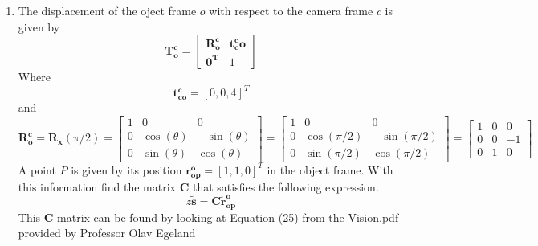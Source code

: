 \documentclass[12pt, letterpaper]{article}
\begin{document}
\begin{enumerate}
    \item The displacement of the oject frame $o$ with respect to the camera frame 
            $c$ is given by
            \begin{equation}
                \bm{T^{c}_o}=\begin{bmatrix}
                    \bm{R^{c}_o} & \bm{t^{c}_co}\\
                    \bm{0^{T}} & 1
                \end{bmatrix}
            \end{equation}
            Where
            \begin{equation*}
                \bm{t^{c}_{co}}=[0,0,4]^T
            \end{equation*}
            and
            \begin{equation*}
                \bm{R^{c}_o}=\bm{R_x}(\pi/2)=
                \begin{bmatrix}
                    1 & 0 & 0 \\
                    0 & \cos(\theta) & -\sin(\theta) \\
                    0 & \sin(\theta) & \cos(\theta)
                \end{bmatrix}=
                \begin{bmatrix}
                    1 & 0 & 0 \\
                    0 & \cos(\pi/2) & -\sin(\pi/2) \\
                    0 & \sin(\pi/2) & \cos(\pi/2)
                \end{bmatrix}=
                \begin{bmatrix}
                    1 & 0 & 0 \\
                    0 & 0 & -1 \\
                    0 & 1 & 0
                \end{bmatrix}
            \end{equation*}
            A point $P$ is given by its position $\bm{r^{o}_{op}}=[1,1,0]^T$
            in the object frame. With this information find the matrix $\bm{C}$
            that satisfies the following expression.
            \begin{equation}
                z\bm{\tilde{s}=C\tilde{r}_{op}^{o}} \label{eq:C}
            \end{equation}
            This $\bm{C}$ matrix can be found by looking at Equation (25) from
            the Vision.pdf provided by Professor Olav Egeland

\end{enumerate}
\end{document}
